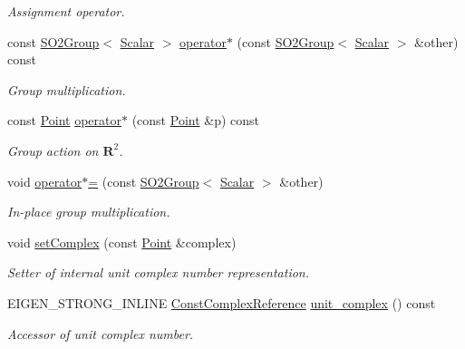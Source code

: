\begin{DoxyCompactItemize}
\begin{DoxyCompactList}\small\item\em Assignment operator. \end{DoxyCompactList}\item 
const \hyperlink{class_sophus_1_1_s_o2_group}{S\+O2\+Group}$<$ \hyperlink{class_sophus_1_1_s_o2_group_base_a075b701502715aecf0bdb3464963d36c}{Scalar} $>$ \hyperlink{class_sophus_1_1_s_o2_group_base_a7afe754a865b880bb6f3c69836512e3d}{operator$\ast$} (const \hyperlink{class_sophus_1_1_s_o2_group}{S\+O2\+Group}$<$ \hyperlink{class_sophus_1_1_s_o2_group_base_a075b701502715aecf0bdb3464963d36c}{Scalar} $>$ \&other) const 
\begin{DoxyCompactList}\small\item\em Group multiplication. \end{DoxyCompactList}\item 
const \hyperlink{class_sophus_1_1_s_o2_group_base_acdbb4a45d5f3d826b6bf8462c92c7f54}{Point} \hyperlink{class_sophus_1_1_s_o2_group_base_a414ff89adc6822ad330a0c9e2694c420}{operator$\ast$} (const \hyperlink{class_sophus_1_1_s_o2_group_base_acdbb4a45d5f3d826b6bf8462c92c7f54}{Point} \&p) const 
\begin{DoxyCompactList}\small\item\em Group action on $ \mathbf{R}^2 $. \end{DoxyCompactList}\item 
void \hyperlink{class_sophus_1_1_s_o2_group_base_a68b1cf84a0e585432508e5310df677db}{operator$\ast$=} (const \hyperlink{class_sophus_1_1_s_o2_group}{S\+O2\+Group}$<$ \hyperlink{class_sophus_1_1_s_o2_group_base_a075b701502715aecf0bdb3464963d36c}{Scalar} $>$ \&other)
\begin{DoxyCompactList}\small\item\em In-\/place group multiplication. \end{DoxyCompactList}\item 
void \hyperlink{class_sophus_1_1_s_o2_group_base_afc649b78e35d2a7504a88002a978b8b9}{set\+Complex} (const \hyperlink{class_sophus_1_1_s_o2_group_base_acdbb4a45d5f3d826b6bf8462c92c7f54}{Point} \&complex)
\begin{DoxyCompactList}\small\item\em Setter of internal unit complex number representation. \end{DoxyCompactList}\item 
E\+I\+G\+E\+N\+\_\+\+S\+T\+R\+O\+N\+G\+\_\+\+I\+N\+L\+I\+NE \hyperlink{class_sophus_1_1_s_o2_group_base_a077856f95a5c02933efd03aa1393825f}{Const\+Complex\+Reference} \hyperlink{class_sophus_1_1_s_o2_group_base_a36a0a9344d5639ddc85a40bc0f4fee8b}{unit\+\_\+complex} () const 
\begin{DoxyCompactList}\small\item\em Accessor of unit complex number. \end{DoxyCompactList}\end{DoxyCompactItemize}
